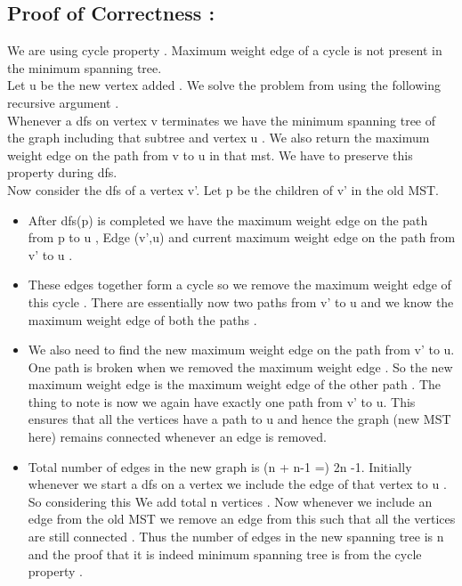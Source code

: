 \documentclass[11pt]{article}
\begin{document}
\subsection*{Proof of Correctness :}
We are using cycle property . Maximum weight edge of a cycle is not present in the minimum spanning tree. \\
Let u be the new vertex added . We solve the problem from using the following recursive argument . \\
Whenever a dfs on vertex v terminates we have the minimum spanning tree of the graph including that subtree and vertex u . We also return the maximum weight edge on the path from v to u in that mst. We have to preserve this property during dfs.   \\
Now consider the dfs of a vertex v'. Let p be the children of v' in the old MST. 
\begin{itemize}
\item After dfs(p) is completed we have the maximum weight edge on the path from p to u , Edge (v',u) and  current maximum weight edge on the path from v' to u .
\item These edges together form a cycle so we remove the maximum weight edge of this cycle . There are essentially now two paths from v' to u and we know the maximum weight edge of both the paths . 
\item We also need to find the new maximum weight edge on the path from v' to u. One path is broken when we removed the maximum weight edge . So the new maximum weight edge is the maximum weight edge of the other path . The thing to note is now we again have exactly one path from v' to u. This  ensures that all the vertices have a path to u and hence the graph (new MST here) remains connected whenever an edge is removed.
\item Total number of edges in the new graph is (n + n-1 =) 2n -1.  Initially whenever we start a dfs on a vertex we include the edge of that vertex to u . So considering this We add total n vertices . Now whenever we include an edge from the old MST we remove an edge from this such that all the vertices are still connected . Thus the number of edges in the new  spanning tree is n and the proof that it is indeed minimum spanning tree is from the cycle property . 
\end{itemize}



\pagebreak
\end{document}
